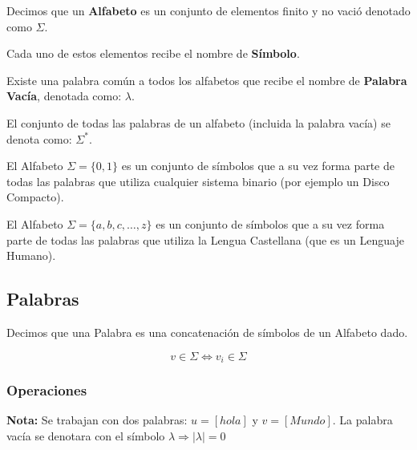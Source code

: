  Decimos que un \textbf{Alfabeto} es un conjunto de elementos finito y no 
vació denotado como $\Sigma$.

{\cor Cada uno de estos elementos recibe el nombre de \textbf{Símbolo}.}

 Existe una palabra común a todos los alfabetos que recibe el nombre de 
\textbf{Palabra Vacía}, denotada como: $\lambda$.

{\cor El conjunto de todas las palabras de un alfabeto (incluida la palabra 
vacía) se denota como: $\Sigma^*$}.

\ejem El Alfabeto $\Sigma = \{0,1\}$ es un conjunto de símbolos que a su vez 
forma parte de todas las palabras que utiliza cualquier sistema binario (por 
ejemplo un Disco Compacto).

\ejem El Alfabeto $\Sigma = \{a,b,c,\ldots,z\}$ es un conjunto de símbolos que 
a 
su vez forma parte de todas las palabras que utiliza la Lengua Castellana (que 
es un Lenguaje Humano).

\subsection{Palabras}

 Decimos que una Palabra es una concatenación de símbolos de un Alfabeto 
dado.

\begin{equation}
v \in \Sigma \Leftrightarrow v_i \in \Sigma
\end{equation}


\subsubsection{Operaciones}

\textbf{Nota:} Se trabajan con dos palabras: $u = [hola]$ y $v = [Mundo]$. La
palabra vacía se denotara con el símbolo $\lambda \Rightarrow |\lambda| = 0$

